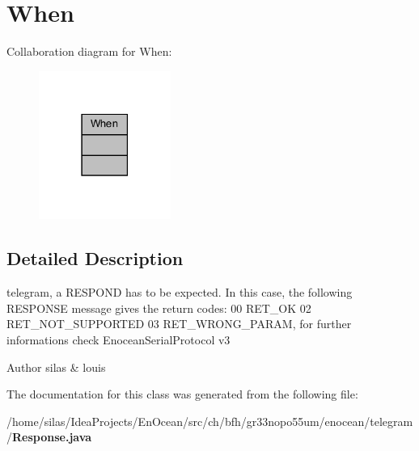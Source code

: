 \section{When}
\label{classWhen}


Collaboration diagram for When\+:\nopagebreak
\begin{figure}[H]
\begin{center}
\leavevmode
\includegraphics[width=122pt]{dc/d4a/classWhen__coll__graph}
\end{center}
\end{figure}


\subsection{Detailed Description}
telegram, a R\+E\+S\+P\+O\+ND has to be expected. In this case, the following R\+E\+S\+P\+O\+N\+SE message gives the return codes\+: 00 R\+E\+T\+\_\+\+OK 02 R\+E\+T\+\_\+\+N\+O\+T\+\_\+\+S\+U\+P\+P\+O\+R\+T\+ED 03 R\+E\+T\+\_\+\+W\+R\+O\+N\+G\+\_\+\+P\+A\+R\+AM, for further informations check Enocean\+Serial\+Protocol v3

\begin{DoxyAuthor}{Author}
silas \& louis 
\end{DoxyAuthor}


The documentation for this class was generated from the following file\+:\begin{DoxyCompactItemize}
\item 
/home/silas/\+Idea\+Projects/\+En\+Ocean/src/ch/bfh/gr33nopo55um/enocean/telegram/{\bf Response.\+java}\end{DoxyCompactItemize}
